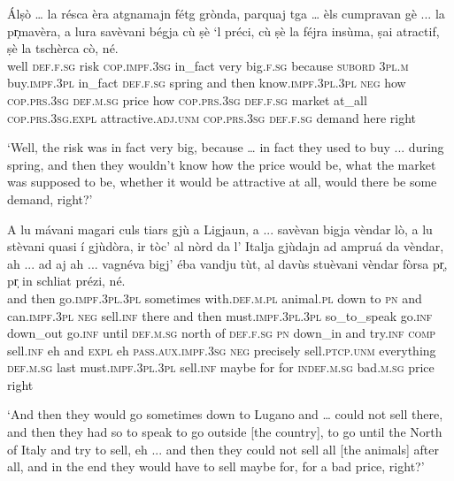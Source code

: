  \begin{linenumbers}
\gll Álṣò … la résca èra atgnamajn fétg grònda, parquaj tga … èls cumpravan gè ... la pr̩mavèra, a lura savèvani bégja cù ṣè `l préci, cù ṣè la féjra insùma, ṣai atractif, ṣè la tschèrca cò, né.\\
well {} \textsc{def.f.sg} risk \textsc{cop.impf.3sg} in\_fact very big.\textsc{f.sg} because \textsc{subord} {} \textsc{3pl.m} buy.\textsc{impf.3pl} in\_fact {} \textsc{def.f.sg} spring and then know.\textsc{impf.3pl.3pl} \textsc{neg} how \textsc{cop.prs.3sg} \textsc{def.m.sg} price how \textsc{cop.prs.3sg} \textsc{def.f.sg} market at\_all \textsc{cop.prs.3sg.expl} attractive.\textsc{adj.unm} \textsc{cop.prs.3sg} \textsc{def.f.sg} demand here right \\
\end{linenumbers}
\medskip
\glt `Well, the risk was in fact very big, because … in fact they used to buy ... during spring, and then they wouldn’t know how the price would be, what the market was supposed to be, whether it would be attractive at all, would there be some demand, right?'
\medskip

\begin{linenumbers}
\gll A lu mávani magari culs tiars gjù a Ligjaun, a ... savèvan bigja vèndar lò, a lu stèvani quasi í gjùdòra, ir tòc’ al nòrd da l’ Italja gjùdajn ad ampruá da vèndar, ah ... ad aj ah ... vagnéva bigj’ éba vandju tùt, al davùs stuèvani vèndar fòrsa pr̩, pr̩ in schliat prézi, né.\\
and then go.\textsc{impf.3pl.3pl} sometimes with.\textsc{def.m.pl} animal.\textsc{pl} down to \textsc{pn} and {} can.\textsc{impf.3pl} \textsc{neg} sell.\textsc{inf} there and then must.\textsc{impf.3pl.3pl} so\_to\_speak go.\textsc{inf} down\_out go.\textsc{inf} until \textsc{def.m.sg} north of \textsc{def.f.sg} \textsc{pn} down\_in and try.\textsc{inf} \textsc{comp} sell.\textsc{inf} eh {} and \textsc{expl} eh {} \textsc{pass.aux.impf.3sg} \textsc{neg} precisely sell.\textsc{ptcp.unm} everything \textsc{def.m.sg} last must.\textsc{impf.3pl.3pl} sell.\textsc{inf} maybe for for \textsc{indef.m.sg} bad.\textsc{m.sg} price right \\
\end{linenumbers}
\medskip
\glt `And then they would go sometimes down to Lugano and … could not sell there, and then they had so to speak to go outside [the country], to go until the North of Italy and try to sell, eh ... and then they could not sell all [the animals] after all, and in the end they would have to sell maybe for, for a bad price, right?'
\medskip

